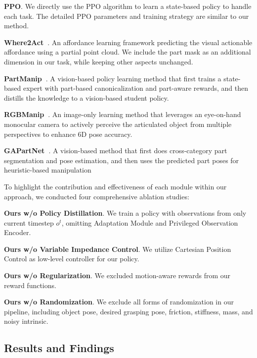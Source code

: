 \textbf{PPO}. We directly use the PPO algorithm to learn a state-based policy to handle each task. The detailed PPO parameters and training strategy are similar to our method.

\textbf{Where2Act~\cite{where2act}}. An affordance learning framework predicting the visual actionable affordance using a partial point cloud. We include the part mask as an additional dimension in our task, while keeping other aspects unchanged. 

\textbf{PartManip~\cite{partmanip}}. A vision-based policy learning method that first trains a state-based expert with part-based canonicalization and part-aware rewards, and then distills the knowledge to a vision-based student policy.

\textbf{RGBManip~\cite{rgbmanip}}. An image-only learning method that leverages an eye-on-hand monocular camera to actively perceive the articulated object from multiple perspectives to enhance 6D pose accuracy.

\textbf{GAPartNet~\cite{gapartnet}}. A vision-based method that first does cross-category part segmentation and pose estimation, and then uses the predicted part poses for heuristic-based manipulation

To highlight the contribution and effectiveness of each module within our approach, we conducted four comprehensive ablation studies:

\textbf{Ours w/o Policy Distillation}. We train a policy with observations from only current timestep $o^t$, omitting Adaptation Module and Privileged Observation Encoder.

\textbf{Ours w/o Variable Impedance Control}. We utilize Cartesian Position Control as low-level controller for our policy.

\textbf{Ours w/o Regularization}. We excluded motion-aware rewards from our reward functions.

\textbf{Ours w/o Randomization}. We exclude all forms of randomization in our pipeline, including object pose, desired grasping pose, friction, stiffness, mass, and noisy intrinsic.

\subsection{Results and Findings}

